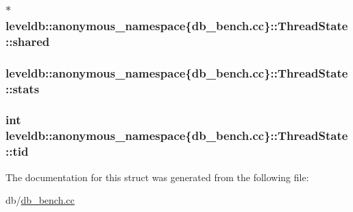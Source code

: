 \subsubsection[{shared}]{$\ast$ leveldb\+::anonymous\+\_\+namespace\{db\+\_\+bench.\+cc\}\+::Thread\+State\+::shared}\label{structleveldb_1_1anonymous__namespace_02db__bench_8cc_03_1_1_thread_state_a1f6527f9fa5ab37cd68e4d99faf274b6}
\hypertarget{structleveldb_1_1anonymous__namespace_02db__bench_8cc_03_1_1_thread_state_ad5c7b6992d52f621389eee96f50afb25}{}
\subsubsection[{stats}]{ leveldb\+::anonymous\+\_\+namespace\{db\+\_\+bench.\+cc\}\+::Thread\+State\+::stats}\label{structleveldb_1_1anonymous__namespace_02db__bench_8cc_03_1_1_thread_state_ad5c7b6992d52f621389eee96f50afb25}
\hypertarget{structleveldb_1_1anonymous__namespace_02db__bench_8cc_03_1_1_thread_state_a8ced82e5f099a0d7f582ec6ca89c56e1}{}
\subsubsection[{tid}]{\setlength{\rightskip}{0pt plus 5cm}int leveldb\+::anonymous\+\_\+namespace\{db\+\_\+bench.\+cc\}\+::Thread\+State\+::tid}\label{structleveldb_1_1anonymous__namespace_02db__bench_8cc_03_1_1_thread_state_a8ced82e5f099a0d7f582ec6ca89c56e1}


The documentation for this struct was generated from the following file\+:\begin{DoxyCompactItemize}
\item 
db/\hyperlink{db__bench_8cc}{db\+\_\+bench.\+cc}\end{DoxyCompactItemize}
